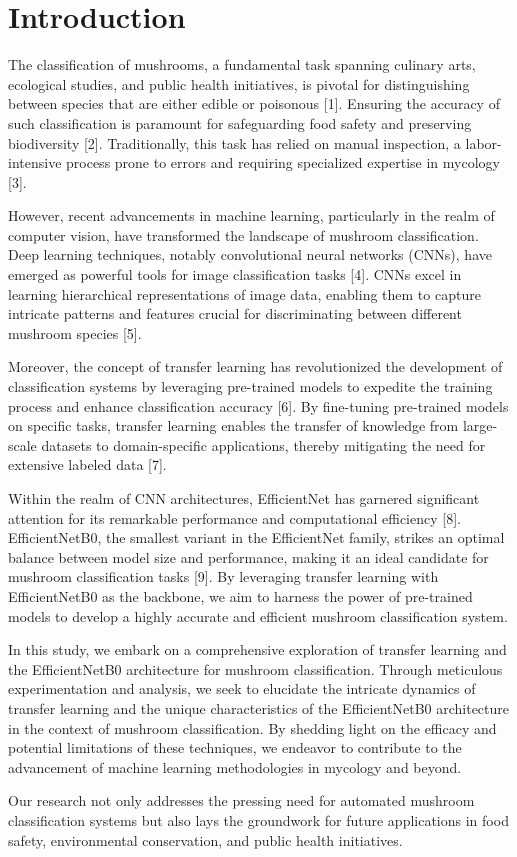 \section{Introduction}
The classification of mushrooms, a fundamental task spanning culinary arts, ecological studies, and public health initiatives, is pivotal for distinguishing between species that are either edible or poisonous [1]. Ensuring the accuracy of such classification is paramount for safeguarding food safety and preserving biodiversity [2]. Traditionally, this task has relied on manual inspection, a labor-intensive process prone to errors and requiring specialized expertise in mycology [3].

However, recent advancements in machine learning, particularly in the realm of computer vision, have transformed the landscape of mushroom classification. Deep learning techniques, notably convolutional neural networks (CNNs), have emerged as powerful tools for image classification tasks [4]. CNNs excel in learning hierarchical representations of image data, enabling them to capture intricate patterns and features crucial for discriminating between different mushroom species [5].

Moreover, the concept of transfer learning has revolutionized the development of classification systems by leveraging pre-trained models to expedite the training process and enhance classification accuracy [6]. By fine-tuning pre-trained models on specific tasks, transfer learning enables the transfer of knowledge from large-scale datasets to domain-specific applications, thereby mitigating the need for extensive labeled data [7].

Within the realm of CNN architectures, EfficientNet has garnered significant attention for its remarkable performance and computational efficiency [8]. EfficientNetB0, the smallest variant in the EfficientNet family, strikes an optimal balance between model size and performance, making it an ideal candidate for mushroom classification tasks [9]. By leveraging transfer learning with EfficientNetB0 as the backbone, we aim to harness the power of pre-trained models to develop a highly accurate and efficient mushroom classification system.

In this study, we embark on a comprehensive exploration of transfer learning and the EfficientNetB0 architecture for mushroom classification. Through meticulous experimentation and analysis, we seek to elucidate the intricate dynamics of transfer learning and the unique characteristics of the EfficientNetB0 architecture in the context of mushroom classification. By shedding light on the efficacy and potential limitations of these techniques, we endeavor to contribute to the advancement of machine learning methodologies in mycology and beyond.

Our research not only addresses the pressing need for automated mushroom classification systems but also lays the groundwork for future applications in food safety, environmental conservation, and public health initiatives.

